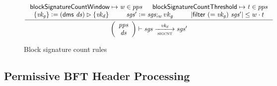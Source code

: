 \documentclass[11pt,a4paper]{article}
\newcommand{\restrictrange}{\rhd}
\newcommand{\var}[1]{\mathit{#1}}
\newcommand{\fun}[1]{\mathsf{#1}}
\newcommand{\type}[1]{\mathsf{#1}}
\newcommand{\pp}[1]{\mathsf{#1}}
\newcommand{\size}[1]{\left| #1 \right|}
\newcommand{\trans}[2]{\xlongrightarrow[\textsc{#1}]{#2}}
\newcommand{\leteq}{\ensuremath{\mathrel{\mathop:}=}}
\newcommand{\partialf}{\mapsto}
\begin{document}
\begin{figure}[ht]
  \begin{equation*}
    \inference
    {
      \pp{blockSignatureCountWindow} \partialf \var{w} \in pps & \pp{blockSignatureCountThreshold} \partialf \var{t} \in pps \\
      \{\var{vk_g}\} \leteq (\fun{dms} ~ \var{ds}) \restrictrange \{\var{vk_d}\}
      & \var{sgs'} \leteq \var{sgs};_w {vk_g} &
      \size{\fun{filter}~(=\var{vk_g})~\var{sgs'}} \leq w \cdot t \\
    }
    {
      \left(
        {\begin{array}{c}
           \var{pps} \\
           \var{ds}
         \end{array}}
     \right)
     \vdash
     {\var{sgs}}
     \trans{sigcnt}{\var{vk_d}}
     {\var{sgs'}}
   }
   \label{eq:rule:sigcnt}
 \end{equation*}
 \caption{Block signature count rules}
 \label{fig:rules:sigcnt}
\end{figure}

\clearpage

\subsection{Permissive BFT Header Processing}

\newcommand{\PBFTEnv}{\type{PBFTEnv}}
\newcommand{\PBFTState}{\type{PBFTState}}

\newcommand{\Bhead}{\type{BlockHeader}}
\newcommand{\Bhtosign}{\type{BHToSign}}

\newcommand{\bhslotname}{bhSlot}
\newcommand{\bhslot}[1]{\fun{\bhslotname}\ #1}
\newcommand{\bhhashname}{bhHash}
\newcommand{\bhhash}[1]{\fun{\bhhashname}\ #1}
\newcommand{\bhprevhashname}{bhPrevHash}
\newcommand{\bhprevhash}[1]{\fun{\bhprevhashname}\ #1}
\newcommand{\bhtosignname}{bhToSign}
\newcommand{\bhtosign}[1]{\fun{\bhtosignname}\ #1}
\end{document}
